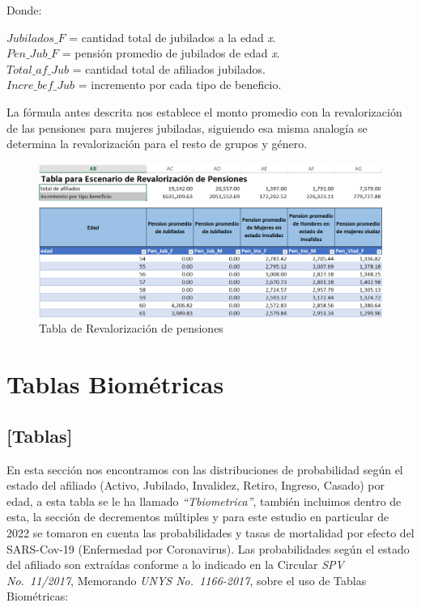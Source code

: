 \documentclass[
  letterpaper,
  DIV=11,
  numbers=noendperiod]{scrreprt}
\begin{document}
Donde:

\(Jubilados\_F\) = cantidad total de jubilados a la edad \emph{x}.\\
\(Pen\_Jub\_F\) = pensión promedio de jubilados de edad \emph{x}.\\
\(Total\_af\_{Jub}\) = cantidad total de afiliados jubilados.\\
\(Incre\_bef\_{Jub}\) = incremento por cada tipo de beneficio.

La fórmula antes descrita nos establece el monto promedio con la
revalorización de las pensiones para mujeres jubiladas, siguiendo esa
misma analogía se determina la revalorización para el resto de grupos y
género.

\begin{figure}

{\centering \includegraphics{images/F/Img2.png}

}

\caption{Tabla de Revalorización de pensiones}

\end{figure}


\hypertarget{tablas-biomuxe9tricas}{%
\chapter{Tablas Biométricas}\label{tablas-biomuxe9tricas}}

\hypertarget{tablas}{%
\section{{[}Tablas{]}}\label{tablas}}

En esta sección nos encontramos con las distribuciones de probabilidad
según el estado del afiliado (Activo, Jubilado, Invalidez, Retiro,
Ingreso, Casado) por edad, a esta tabla se le ha llamado
\emph{``Tbiometrica''}, también incluimos dentro de esta, la sección de
decrementos múltiples y para este estudio en particular de 2022 se
tomaron en cuenta las probabilidades y tasas de mortalidad por efecto
del SARS-Cov-19 (Enfermedad por Coronavirus). Las probabilidades según
el estado del afiliado son extraídas conforme a lo indicado en la
Circular \emph{SPV No.~11/2017}, Memorando \emph{UNYS No.~1166-2017},
sobre el uso de Tablas Biométricas:
\end{document}
